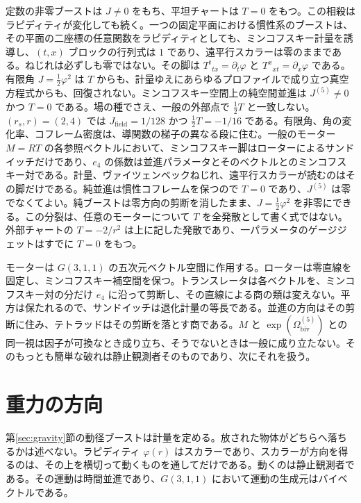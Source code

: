 \documentclass[a4paper]{article}
\begin{document}
定数の非零ブーストは \(J\neq 0\) をもち、平坦チャートは \(T=0\) をもつ。この相殺はラピディティが変化しても続く。一つの固定平面における慣性系のブーストは、その平面の二座標の任意関数をラピディティとしても、ミンコフスキー計量を誘導し、\((t,x)\) ブロックの行列式は \(1\) であり、遠平行スカラーは零のままである。ねじれは必ずしも零ではない。その脚は \(T^{t}{}_{tx}=\partial_{t}\varphi\) と \(T^{x}{}_{xt}=\partial_{x}\varphi\) である。有限角 \(J=\tfrac12\varphi^{2}\) は \(T\) からも、計量ゆえにあらゆるプロファイルで成り立つ真空方程式からも、回復されない。ミンコフスキー空間上の純空間並進は \(J^{(5)}\neq 0\) かつ \(T=0\) である。場の種でさえ、一般の外部点で \(\tfrac12 T\) と一致しない。\((r_{s},r)=(2,4)\) では \(J_{\mathrm{field}}=1/128\) かつ \(\tfrac12 T=-1/16\) である。有限角、角の変化率、コフレーム密度は、導関数の梯子の異なる段に住む。一般のモーター \(M=RT\) の各参照ベクトルにおいて、ミンコフスキー脚はローターによるサンドイッチだけであり、\(e_{4}\) の係数は並進パラメータとそのベクトルとのミンコフスキー対である。計量、ヴァイツェンベックねじれ、遠平行スカラーが読むのはその脚だけである。純並進は慣性コフレームを保つので \(T=0\) であり、\(J^{(5)}\) は零でなくてよい。純ブーストは零方向の剪断を消したまま、\(J=\tfrac12\varphi^{2}\) を非零にできる。この分裂は、任意のモーターについて \(T\) を全発散として書く式ではない。外部チャートの \(T=-2/r^{2}\) は上に記した発散であり、一パラメータのゲージジェットはすでに \(T=0\) をもつ。

モーターは \(G(3,1,1)\) の五次元ベクトル空間に作用する。ローターは零直線を固定し、ミンコフスキー補空間を保つ。トランスレータは各ベクトルを、ミンコフスキー対の分だけ \(e_{4}\) に沿って剪断し、その直線による商の類は変えない。平方は保たれるので、サンドイッチは退化計量の等長である。並進の方向はその剪断に住み、テトラッドはその剪断を落とす商である。\(M\) と \(\exp(\Omega_{\mathrm{biv}}^{(5)})\) との同一視は因子が可換なとき成り立ち、そうでないときは一般に成り立たない。そのもっとも簡単な破れは静止観測者そのものであり、次にそれを扱う。

\section{重力の方向}
\label{sec:direction}

第\ref{sec:gravity}節の動径ブーストは計量を定める。放された物体がどちらへ落ちるかは述べない。ラピディティ \(\varphi(r)\) はスカラーであり、スカラーが方向を得るのは、その上を横切って動くものを通してだけである。動くのは静止観測者である。その運動は時間並進であり、\(G(3,1,1)\) において運動の生成元はバイベクトルである。
\end{document}
